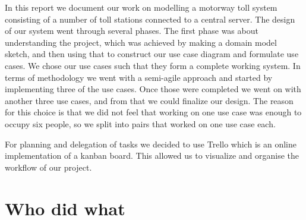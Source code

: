 
In this report we document our work on modelling a motorway toll system consisting of a number of toll stations connected to a central server. The design of our system went through several phases. The first phase was about understanding the project, which was achieved by making a domain model sketch, and then using that to construct our use case diagram and formulate use cases. We chose our use cases such that they form a complete working system. In terms of methodology we went with a semi-agile approach and started by implementing three of the use cases. Once those were completed we went on with another three use cases, and from that we could finalize our design. The reason for this choice is that we did not feel that working on one use case was enough to occupy six people, so we split into pairs that worked on one use case each.

For planning and delegation of tasks we decided to use Trello which is an online implementation of a kanban board. This allowed us to visualize and organise the workflow of our project. 

\section{Who did what}
